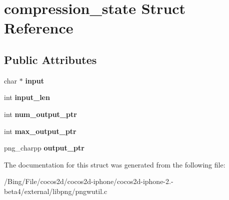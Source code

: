 \hypertarget{structcompression__state}{\section{compression\-\_\-state Struct Reference}
\label{structcompression__state}
}
\subsection*{Public Attributes}
\begin{DoxyCompactItemize}
\item 
\hypertarget{structcompression__state_a98d59b6660574737692d140362d80607}{char $\ast$ {\bfseries input}}\label{structcompression__state_a98d59b6660574737692d140362d80607}

\item 
\hypertarget{structcompression__state_a6be5bdc61cc3af7978ad2a548f13bea0}{int {\bfseries input\-\_\-len}}\label{structcompression__state_a6be5bdc61cc3af7978ad2a548f13bea0}

\item 
\hypertarget{structcompression__state_ac31fbbf713422f6f70613be213e53fae}{int {\bfseries num\-\_\-output\-\_\-ptr}}\label{structcompression__state_ac31fbbf713422f6f70613be213e53fae}

\item 
\hypertarget{structcompression__state_aac3c70539bb6a785f18d442363bc613b}{int {\bfseries max\-\_\-output\-\_\-ptr}}\label{structcompression__state_aac3c70539bb6a785f18d442363bc613b}

\item 
\hypertarget{structcompression__state_a3e99581f937a4138a4730494987c1b86}{png\-\_\-charpp {\bfseries output\-\_\-ptr}}\label{structcompression__state_a3e99581f937a4138a4730494987c1b86}

\end{DoxyCompactItemize}


The documentation for this struct was generated from the following file\-:\begin{DoxyCompactItemize}
\item 
/\-Bing/\-File/cocos2d/cocos2d-\/iphone/cocos2d-\/iphone-\/2.-\/beta4/external/libpng/pngwutil.\-c\end{DoxyCompactItemize}
